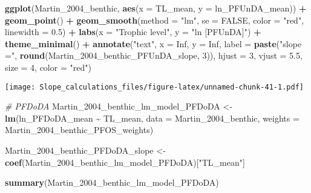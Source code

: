 \documentclass[
]{article}
\newenvironment{Shaded}{\begin{snugshade}}{\end{snugshade}}
\newcommand{\AttributeTok}[1]{\textcolor[rgb]{0.13,0.29,0.53}{#1}}
\newcommand{\CommentTok}[1]{\textcolor[rgb]{0.56,0.35,0.01}{\textit{#1}}}
\newcommand{\ConstantTok}[1]{\textcolor[rgb]{0.56,0.35,0.01}{#1}}
\newcommand{\DecValTok}[1]{\textcolor[rgb]{0.00,0.00,0.81}{#1}}
\newcommand{\FloatTok}[1]{\textcolor[rgb]{0.00,0.00,0.81}{#1}}
\newcommand{\FunctionTok}[1]{\textcolor[rgb]{0.13,0.29,0.53}{\textbf{#1}}}
\newcommand{\NormalTok}[1]{#1}
\newcommand{\OtherTok}[1]{\textcolor[rgb]{0.56,0.35,0.01}{#1}}
\newcommand{\SpecialCharTok}[1]{\textcolor[rgb]{0.81,0.36,0.00}{\textbf{#1}}}
\newcommand{\StringTok}[1]{\textcolor[rgb]{0.31,0.60,0.02}{#1}}
\begin{document}
\begin{Shaded}
\begin{Highlighting}[]
\FunctionTok{ggplot}\NormalTok{(Martin\_2004\_benthic, }\FunctionTok{aes}\NormalTok{(}\AttributeTok{x =}\NormalTok{ TL\_mean, }\AttributeTok{y =}\NormalTok{ ln\_PFUnDA\_mean)) }\SpecialCharTok{+}
  \FunctionTok{geom\_point}\NormalTok{() }\SpecialCharTok{+}
  \FunctionTok{geom\_smooth}\NormalTok{(}\AttributeTok{method =} \StringTok{"lm"}\NormalTok{, }\AttributeTok{se =} \ConstantTok{FALSE}\NormalTok{, }\AttributeTok{color =} \StringTok{"red"}\NormalTok{, }\AttributeTok{linewidth =} \FloatTok{0.5}\NormalTok{) }\SpecialCharTok{+}
  \FunctionTok{labs}\NormalTok{(}\AttributeTok{x =} \StringTok{"Trophic level"}\NormalTok{,}
       \AttributeTok{y =} \StringTok{"ln [PFUnDA]"}\NormalTok{) }\SpecialCharTok{+}
  \FunctionTok{theme\_minimal}\NormalTok{() }\SpecialCharTok{+}
  \FunctionTok{annotate}\NormalTok{(}\StringTok{"text"}\NormalTok{, }\AttributeTok{x =} \ConstantTok{Inf}\NormalTok{, }\AttributeTok{y =} \ConstantTok{Inf}\NormalTok{, }\AttributeTok{label =} \FunctionTok{paste}\NormalTok{(}\StringTok{"slope ="}\NormalTok{, }\FunctionTok{round}\NormalTok{(Martin\_2004\_benthic\_PFUnDA\_slope, }\DecValTok{3}\NormalTok{)), }
           \AttributeTok{hjust =} \DecValTok{3}\NormalTok{, }\AttributeTok{vjust =} \FloatTok{5.5}\NormalTok{, }\AttributeTok{size =} \DecValTok{4}\NormalTok{, }\AttributeTok{color =} \StringTok{"red"}\NormalTok{)}
\end{Highlighting}
\end{Shaded}

\texttt{[image: Slope\_calculations\_files/figure-latex/unnamed-chunk-41-1.pdf]}

\begin{Shaded}
\begin{Highlighting}[]
\CommentTok{\# PFDoDA}
\NormalTok{Martin\_2004\_benthic\_lm\_model\_PFDoDA }\OtherTok{\textless{}{-}} \FunctionTok{lm}\NormalTok{(ln\_PFDoDA\_mean }\SpecialCharTok{\textasciitilde{}}\NormalTok{ TL\_mean, }
                                        \AttributeTok{data =}\NormalTok{ Martin\_2004\_benthic,}
                                        \AttributeTok{weights =}\NormalTok{ Martin\_2004\_benthic\_PFOS\_weights)}

\NormalTok{Martin\_2004\_benthic\_PFDoDA\_slope }\OtherTok{\textless{}{-}} \FunctionTok{coef}\NormalTok{(Martin\_2004\_benthic\_lm\_model\_PFDoDA)[}\StringTok{"TL\_mean"}\NormalTok{]}

\FunctionTok{summary}\NormalTok{(Martin\_2004\_benthic\_lm\_model\_PFDoDA)}
\end{Highlighting}
\end{Shaded}
\end{document}
